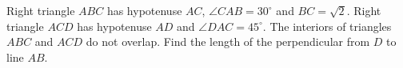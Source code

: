 Right triangle $ABC$ has hypotenuse $AC$, $\angle CAB=30^\circ$ and $BC=\sqrt2$. Right triangle $ACD$ has hypotenuse $AD$ and $\angle DAC=45^\circ$. The interiors of triangles $ABC$ and $ACD$ do not overlap. Find the length of the perpendicular from $D$ to line $AB$.
